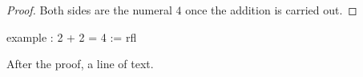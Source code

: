 \begin{leanproof}[decl=two_add_two]
\begin{proof}
Both sides are the numeral $4$ once the addition is carried out.
\end{proof}
\begin{leancode}
example : 2 + 2 = 4 := rfl
\end{leancode}
\end{leanproof}
After the proof, a line of text.
